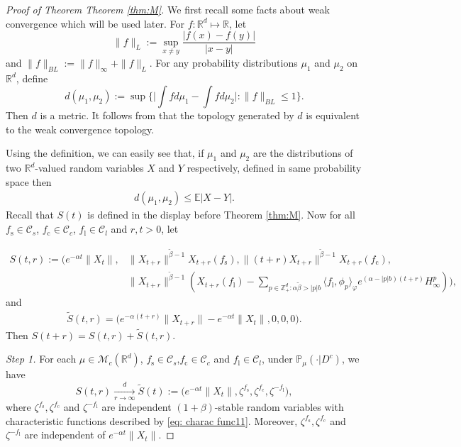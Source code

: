 \documentclass[12pt,a4paper]{amsart}
\theoremstyle{plain}
\theoremstyle{definition}
\numberwithin{equation}{section}
\begin{document}
\begin{proof}[Proof of Theorem Theorem \ref{thm:M}]
 We first recall some facts about weak convergence which will be used later. For $f:\mathbb R^d\mapsto \mathbb R$, let
 $$
 \|f\|_L:=\sup_{x\neq y}\frac{|f(x)-f(y)|}{|x-y|}
 $$
 and $\|f\|_{BL}:= \|f\|_{\infty}+\|f\|_L. $
 For any {\color{red}probability distributions} $\mu_1$ and $\mu_2$ on $\mathbb R^d$, define
\[
  d(\mu_1,\mu_2):=\sup\Big\{\Big|\int fd\mu_1-\int f d\mu_2\Big|:\|f\|_{BL}\leq 1\Big\}.
\]
Then $d$ is a metric. It follows from \cite[Theorem 11.3.3]{Dudley2002} that the topology generated by $d$ is equivalent to the weak convergence topology. 

Using the definition, we can easily see that, if $\mu_1$ and $\mu_2$ are the distributions of two $\mathbb R^d $-valued random variables $X$ and $Y$ respectively, {\color{red} defined in same probability space} then
\begin{align}\label{ineq: distribution control}
  d(\mu_1,\mu_2) \leq \mathbb E|X-Y|.
\end{align}
Recall that $S(t)$ is defined in {\color{blue}the display before Theorem \ref{thm:M}.}
Now for all $f_\mathrm s\in \mathcal C_s $, $f_\mathrm c \in \mathcal C_c$, $f_\mathrm l \in \mathcal C_l$ and
$r,t>0$, let

\begin{align}
  S(t,r):=\Big(e^{-\alpha t}\|X_t\|,& \|X_{t+r}\|^{\tilde{\beta}-1}X_{t+r}(f_\mathrm s), \|(t+r)X_{t+r}\|^{\tilde{\beta}-1}X_{t+r}(f_\mathrm c),\\
& \|X_{t+r}\|^{\tilde{\beta}-1}(X_{t+r}(f_\mathrm l)-\sum_{p\in \mathbb Z_+^d:\alpha\tilde{\beta}>|p|b}\langle f_\mathrm l,\phi_p\rangle_{\varphi}e^{(\alpha-|p|b)(t+r)}H_{\infty}^p )\Big),
\end{align}
and
\begin{align}
\widetilde{S}(t,r)= \Big(e^{-\alpha (t+r)}\|X_{t+r}\|-e^{-\alpha t}\|X_t\|,0,0,0\Big).
\end{align}
Then $S(t+r)=S(t,r)+\widetilde{S}(t,r)$.

\emph{Step 1.} For each $\mu\in \mathcal M_c(\mathbb R^d)$, $f_\mathrm s\in \mathcal C_s$,$f_\mathrm c\in \mathcal C_c$ and $f_\mathrm l\in \mathcal C_l$, under $\mathbb P_{\mu}(\cdot|D^c)$, we have
\[
S(t,r)\xrightarrow[r\rightarrow \infty]{d}\widetilde{S}(t):=\Big(e^{-\alpha t}\|X_t\|,\zeta^{f_\mathrm s},\zeta^{f_\mathrm c},\zeta^{-f_\mathrm l}\Big),
\]
where $\zeta^{f_\mathrm s},\zeta^{f_\mathrm c}$ and $\zeta^{-f_\mathrm l}$ are independent $(1+\beta)$-stable random variables with characteristic functions described by \eqref{eq: charac func11}. Moreover,  $\zeta^{f_\mathrm s},\zeta^{f_\mathrm c}$ and $\zeta^{-f_\mathrm l}$ are independent of $e^{-\alpha t}\|X_t\|$.


\end{proof}
\end{document}
